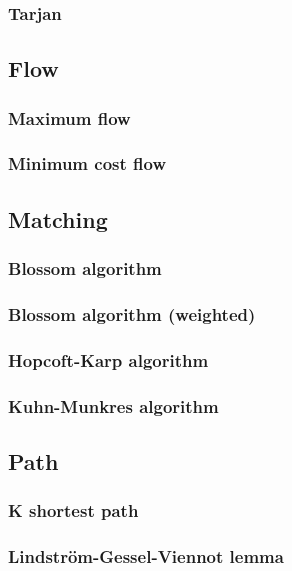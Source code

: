 \documentclass[titlepage,a4paper,10pt]{article}
\begin{document}
\begin{multicols}{2}
\begin{spacing}{0.8}
{				\subsubsection{Tarjan}
					
			\subsection{Flow}
				\subsubsection{Maximum flow}
					
				\subsubsection{Minimum cost flow}
					
			\subsection{Matching}
				
				\subsubsection{Blossom algorithm}
					
				\subsubsection{Blossom algorithm (weighted)}
					
				\subsubsection{Hopcoft-Karp algorithm}
					
				\subsubsection{Kuhn-Munkres algorithm}
					
			\subsection{Path}
				\subsubsection{K shortest path}
					
				\subsubsection{Lindström-Gessel-Viennot lemma}
					
}
\end{spacing}
\end{multicols}
\end{document}
